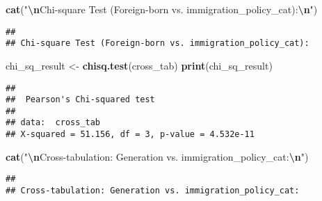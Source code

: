 \documentclass[
]{article}
\newenvironment{Shaded}{\begin{snugshade}}{\end{snugshade}}
\newcommand{\FunctionTok}[1]{\textcolor[rgb]{0.13,0.29,0.53}{\textbf{#1}}}
\newcommand{\NormalTok}[1]{#1}
\newcommand{\OtherTok}[1]{\textcolor[rgb]{0.56,0.35,0.01}{#1}}
\newcommand{\SpecialCharTok}[1]{\textcolor[rgb]{0.81,0.36,0.00}{\textbf{#1}}}
\newcommand{\StringTok}[1]{\textcolor[rgb]{0.31,0.60,0.02}{#1}}
\begin{document}
\begin{Shaded}
\begin{Highlighting}[]
\FunctionTok{cat}\NormalTok{(}\StringTok{"}\SpecialCharTok{\textbackslash{}n}\StringTok{Chi{-}square Test (Foreign{-}born vs. immigration\_policy\_cat):}\SpecialCharTok{\textbackslash{}n}\StringTok{"}\NormalTok{)}
\end{Highlighting}
\end{Shaded}

\begin{verbatim}
## 
## Chi-square Test (Foreign-born vs. immigration_policy_cat):
\end{verbatim}

\begin{Shaded}
\begin{Highlighting}[]
\NormalTok{chi\_sq\_result }\OtherTok{\textless{}{-}} \FunctionTok{chisq.test}\NormalTok{(cross\_tab)}
\FunctionTok{print}\NormalTok{(chi\_sq\_result)}
\end{Highlighting}
\end{Shaded}

\begin{verbatim}
## 
##  Pearson's Chi-squared test
## 
## data:  cross_tab
## X-squared = 51.156, df = 3, p-value = 4.532e-11
\end{verbatim}

\begin{Shaded}
\begin{Highlighting}[]
\FunctionTok{cat}\NormalTok{(}\StringTok{"}\SpecialCharTok{\textbackslash{}n}\StringTok{Cross{-}tabulation: Generation vs. immigration\_policy\_cat:}\SpecialCharTok{\textbackslash{}n}\StringTok{"}\NormalTok{)}
\end{Highlighting}
\end{Shaded}

\begin{verbatim}
## 
## Cross-tabulation: Generation vs. immigration_policy_cat:
\end{verbatim}

\begin{Shaded}
\end{Shaded}
\end{document}
